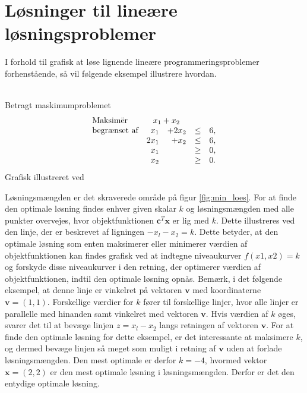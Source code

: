 \section{Løsninger til lineære løsningsproblemer}
\label{heeeeejjulle}
I forhold til grafisk at løse lignende lineære programmeringsproblemer forhenstående, så vil følgende eksempel illustrere hvordan. 
\\\\
\begin{eks}\label{eks:min_loes}
Betragt maskimumproblemet
%
\begin{align*}
\begin{array}{lrrlr}
\text{Maksimër}		&	\multicolumn{2}{c}{x_1+x_2}  &\\
\text{begrænset af}	&x_1& + 2x_2			&\leq 	& 6,\\
					&2x_1& + x_2			&\leq	& 6,\\
					&x_1&    				&\geq	& 0,\\
					&x_2&    				&\geq	& 0.\\
\end{array}
\end{align*}
%
Grafisk illustreret ved 
%

%
\noindent
Løsningsmængden er det skraverede område på figur \ref{fig:min_loes}. For at finde den optimale løsning findes enhver given skalar $k$ og løsningsmængden med alle punkter overvejes, hvor objektfunktionen $\textbf{c}^T\textbf{x}$ er lig med $k$. Dette illustreres ved den linje, der er beskrevet af ligningen $-x_l-x_2=k$. Dette betyder, at den optimale løsning som enten maksimerer eller minimerer værdien
af objektfunktionen kan findes grafisk ved at indtegne niveaukurver $f(x1, x2)=k$ og forskyde disse niveaukurver i den retning, der optimerer værdien af objektfunktionen, indtil den optimale løsning opnås.  Bemærk, i det følgende eksempel, at denne linje er vinkelret på vektoren $\textbf{v}$ med koordinaterne $\textbf{v}=(1,1)$.
Forskellige værdier for $k$ fører til forskellige linjer, hvor  alle linjer er parallelle med hinanden samt vinkelret med vektoren $\textbf{v}$. Hvis værdien af $k$ øges, svarer det til at bevæge linjen $z=x_l-x_2$ langs retningen af vektoren $\textbf{v}$. For at finde den optimale løsning for dette eksempel, er det interessante at maksimere $k$, og dermed bevæge linjen så meget som muligt i retning af $\textbf{v}$ uden at forlade løsningsmængden. Den mest optimale er derfor $k = -4$, hvormed vektor $\textbf{x}=(2,2)$ er den mest optimale løsning i løsningsmængden. Derfor er det den entydige optimale løsning. \\\\

\end{eks}
